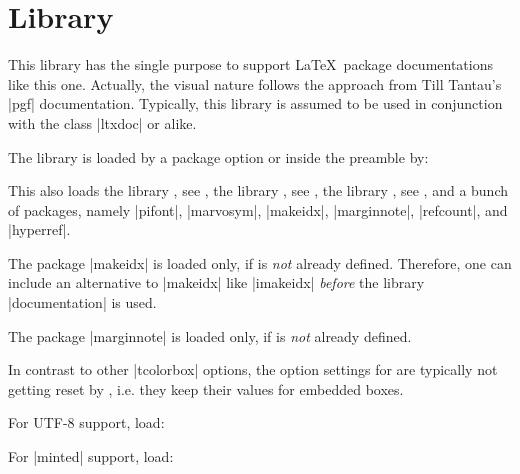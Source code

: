 \clearpage
\section{Library }\label{sec:documentation}%
%
This library has the single purpose to support \LaTeX\ package documentations
like this one. Actually, the visual nature follows the approach from
Till Tantau's |pgf| \cite{tantau:2015a} documentation.
Typically, this library is assumed to be used in conjunction with the
class |ltxdoc| or alike.

The library is loaded by a package option or inside the preamble by:
\begin{dispListing}
\end{dispListing}
This also loads the library , see ,
the library , see ,
the library , see ,
and a bunch of packages, namely
|pifont|, |marvosym|, |makeidx|, |marginnote|, |refcount|, and |hyperref|.

\begin{marker}
The package |makeidx| is loaded only, if  is
\emph{not} already defined. Therefore, one can include an alternative to |makeidx| like
|imakeidx| \emph{before} the library |documentation| is used.
\end{marker}
\begin{marker}
The package |marginnote| is loaded only, if  is
\emph{not} already defined.
\end{marker}
\begin{marker}
In contrast to other |tcolorbox| options, the option
settings for  are typically not
getting reset by , i.e. they keep their
values for embedded boxes.
\end{marker}

For UTF-8 support, load:
\begin{dispListing}
\end{dispListing}

For |minted| \cite{poore:2015a} support, load:
\begin{dispListing}
\end{dispListing}


